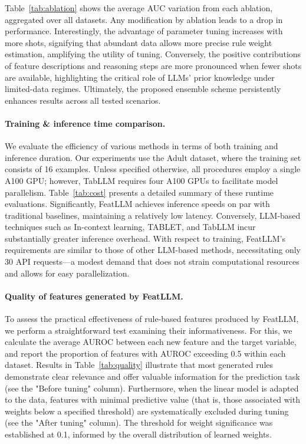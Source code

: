 Table~\ref{tab:ablation} shows the average AUC variation from each ablation, aggregated over all datasets. Any modification by ablation leads to a drop in performance. Interestingly, the advantage of parameter tuning increases with more shots, signifying that abundant data allows more precise rule weight estimation, amplifying the utility of tuning. Conversely, the positive contributions of feature descriptions and reasoning steps are more pronounced when fewer shots are available, highlighting the critical role of LLMs' prior knowledge under limited-data regimes. Ultimately, the proposed ensemble scheme persistently enhances results across all tested scenarios.

\vspace*{-0.12in}
\paragraph{Training \& inference time comparison.} We evaluate the efficiency of various methods in terms of both training and inference duration. Our experiments use the Adult dataset, where the training set consists of 16 examples. Unless specified otherwise, all procedures employ a single A100 GPU; however, TabLLM requires four A100 GPUs to facilitate model parallelism. Table~\ref{tab:cost} presents a detailed summary of these runtime evaluations. Significantly, \textsf{FeatLLM} achieves inference speeds on par with traditional baselines, maintaining a relatively low latency. Conversely, LLM-based techniques such as In-context learning, TABLET, and TabLLM incur substantially greater inference overhead. With respect to training, \textsf{FeatLLM}'s requirements are similar to those of other LLM-based methods, necessitating only 30 API requests—a modest demand that does not strain computational resources and allows for easy parallelization.

\vspace*{-0.12in}
\paragraph{Quality of features generated by \textsf{FeatLLM}.}
To assess the practical effectiveness of rule-based features produced by \textsf{FeatLLM}, we perform a straightforward test examining their informativeness. For this, we calculate the average AUROC between each new feature and the target variable, and report the proportion of features with AUROC exceeding 0.5 within each dataset. Results in Table~\ref{tab:quality} illustrate that most generated rules demonstrate clear relevance and offer valuable information for the prediction task (see the "Before tuning" column). Furthermore, when the linear model is adapted to the data, features with minimal predictive value (that is, those associated with weights below a specified threshold) are systematically excluded during tuning (see the "After tuning" column). The threshold for weight significance was established at 0.1, informed by the overall distribution of learned weights.


